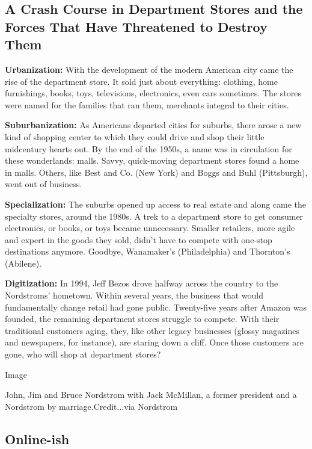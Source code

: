 \hypertarget{a-crash-course-in-department-stores-and-the-forces-that-have-threatened-to-destroy-them}{%
\subsection{A Crash Course in Department Stores and the Forces That Have
Threatened to Destroy
Them}\label{a-crash-course-in-department-stores-and-the-forces-that-have-threatened-to-destroy-them}}

\textbf{Urbanization:} With the development of the modern American city
came the rise of the department store. It sold just about everything:
clothing, home furnishings, books, toys, televisions, electronics, even
cars sometimes. The stores were named for the families that ran them,
merchants integral to their cities.

\textbf{Suburbanization:} As Americans departed cities for suburbs,
there arose a new kind of shopping center to which they could drive and
shop their little midcentury hearts out. By the end of the 1950s, a name
was in circulation for these wonderlands: malls. Savvy, quick-moving
department stores found a home in malls. Others, like Best and Co. (New
York) and Boggs and Buhl (Pittsburgh), went out of business.

\textbf{Specialization:} The suburbs opened up access to real estate and
along came the specialty stores, around the 1980s. A trek to a
department store to get consumer electronics, or books, or toys became
unnecessary. Smaller retailers, more agile and expert in the goods they
sold, didn't have to compete with one-stop destinations anymore.
Goodbye, Wanamaker's (Philadelphia) and Thornton's (Abilene).

\textbf{Digitization:} In 1994, Jeff Bezos drove halfway across the
country to the Nordstroms' hometown. Within several years, the business
that would fundamentally change retail had gone public. Twenty-five
years after Amazon was founded, the remaining department stores struggle
to compete. With their traditional customers aging, they, like other
legacy businesses (glossy magazines and newspapers, for instance), are
staring down a cliff. Once those customers are gone, who will shop at
department stores?

Image

John, Jim and Bruce Nordstrom with Jack McMillan, a former president and
a Nordstrom by marriage.Credit...via Nordstrom

\hypertarget{online-ish}{%
\subsection{Online-ish}\label{online-ish}}

